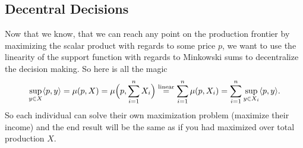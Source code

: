 \subsection{Decentral Decisions}

Now that we know, that we can reach any point on the production frontier by
maximizing the scalar product with regards to some price \(p\), we want to
use the linearity of the support function with regards to Minkowski sums to
decentralize the decision making.
So here is all the magic
\[
	\sup_{y\in X}\langle p, y\rangle
	= \mu(p, X)
	= \mu\Bigl(p, \sum_{i=1}^n X_i\Bigr)
	\overset{\text{linear}}= \sum_{i=1}^n \mu(p, X_i)
	= \sum_{i=1}^n \sup_{y\in X_i} \langle p, y\rangle.
\]
So each individual can solve their own maximization problem (maximize their
income) and the end result will be the same as if you had maximized over total
production \(X\).
